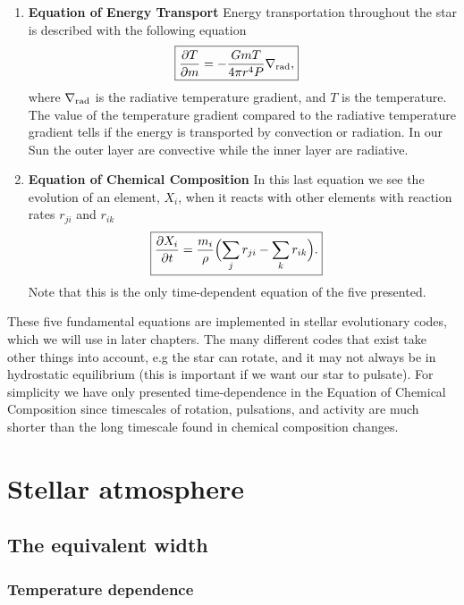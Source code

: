 \begin{enumerate}
    \item \textbf{Equation of Energy Transport}
        \nicebreak
        Energy transportation throughout the star is described with the
        following equation
        \begin{align}
            \Aboxed{\pd{T}{m} &= -\frac{GmT}{4\pi r^4P}\nabla_\tm{rad},}
        \end{align}
        where $\nabla_{\textnormal{rad}}$ is the radiative temperature gradient, and $T$
        is the temperature. The value of the temperature gradient compared to
        the radiative temperature gradient tells if the energy is transported by
        convection or radiation. In our Sun the outer layer are convective while
        the inner layer are radiative.

    \item \textbf{Equation of Chemical Composition}
        \nicebreak
        In this last equation we see the evolution of an element, $X_i$, when
        it reacts with other elements with reaction rates $r_{ji}$ and $r_{ik}$
        \begin{align}
            \Aboxed{\pd{X_i}{t} &= \frac{m_i}{\rho} \Bigl( \sum_j r_{ji} - \sum_k r_{ik}\Bigr).}
        \end{align}
        Note that this is the only time-dependent equation of the five
        presented.
\end{enumerate}

These five fundamental equations are implemented in stellar evolutionary codes,
which we will use in later chapters. The many different codes that exist take
other things into account, e.g the star can rotate, and it may not always be in
hydrostatic equilibrium (this is important if we want our star to pulsate). For
simplicity we have only presented time-dependence in the Equation of Chemical
Composition since timescales of rotation, pulsations, and activity are much
shorter than the long timescale found in chemical composition changes.


\section{Stellar atmosphere}

\subsection{The equivalent width}

\subsubsection{Temperature dependence}

